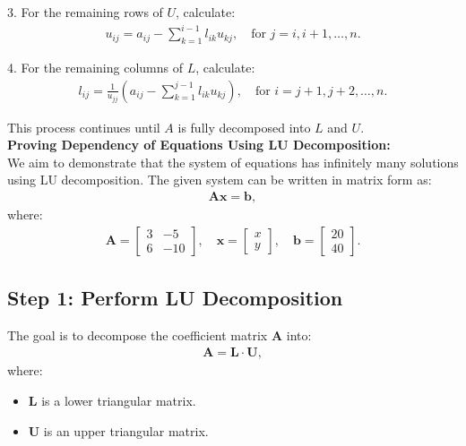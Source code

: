\documentclass[journal,12pt,onecolumn]{IEEEtran}
\theoremstyle{remark}
\begin{document}
3. For the remaining rows of $U$, calculate:
   \begin{align}
   u_{ij} = a_{ij} - \sum_{k=1}^{i-1} l_{ik} u_{kj}, \quad \text{for } j = i, i+1, \dots, n.
   \end{align}

4. For the remaining columns of $L$, calculate:
   \begin{align}
   l_{ij} = \frac{1}{u_{jj}} \left( a_{ij} - \sum_{k=1}^{j-1} l_{ik} u_{kj} \right), \quad \text{for } i = j+1, j+2, \dots, n.
   \end{align}

This process continues until $A$ is fully decomposed into $L$ and $U$.\\
\textbf{Proving Dependency of Equations Using LU Decomposition:}\\
We aim to demonstrate that the system of equations has infinitely many solutions using LU decomposition. The given system can be written in matrix form as:
\begin{align}
\mathbf{A} \mathbf{x} = \mathbf{b},
\end{align}
where:
\begin{align}
\mathbf{A} =
\begin{bmatrix}
3 & -5 \\
6 & -10
\end{bmatrix}, \quad
\mathbf{x} =
\begin{bmatrix}
x \\
y
\end{bmatrix}, \quad
\mathbf{b} =
\begin{bmatrix}
20 \\
40
\end{bmatrix}.
\end{align}

\subsection*{Step 1: Perform LU Decomposition}

The goal is to decompose the coefficient matrix $\mathbf{A}$ into:
\begin{align}
\mathbf{A} = \mathbf{L} \cdot \mathbf{U},
\end{align}
where:
\begin{itemize}
    \item $\mathbf{L}$ is a lower triangular matrix.
    \item $\mathbf{U}$ is an upper triangular matrix.
\end{itemize}
\end{document}
